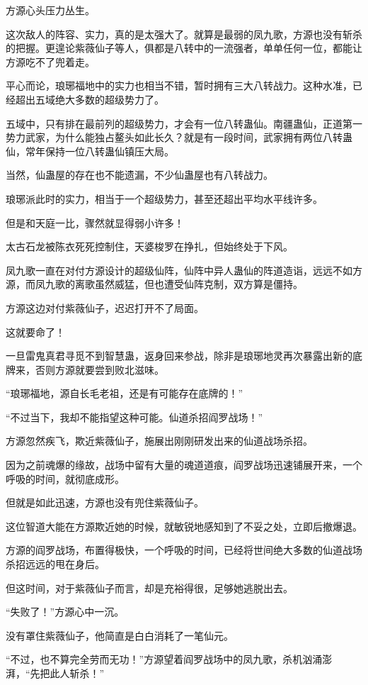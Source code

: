 \begin{this_body}
方源心头压力丛生。

这次敌人的阵容、实力，真的是太强大了。就算是最弱的凤九歌，方源也没有斩杀的把握。更遑论紫薇仙子等人，俱都是八转中的一流强者，单单任何一位，都能让方源吃不了兜着走。

平心而论，琅琊福地中的实力也相当不错，暂时拥有三大八转战力。这种水准，已经超出五域绝大多数的超级势力了。

五域中，只有排在最前列的超级势力，才会有一位八转蛊仙。南疆蛊仙，正道第一势力武家，为什么能独占鳌头如此长久？就是有一段时间，武家拥有两位八转蛊仙，常年保持一位八转蛊仙镇压大局。

当然，仙蛊屋的存在也不能遗漏，不少仙蛊屋也有八转战力。

琅琊派此时的实力，相当于一个超级势力，甚至还超出平均水平线许多。

但是和天庭一比，骤然就显得弱小许多！

太古石龙被陈衣死死控制住，天婆梭罗在挣扎，但始终处于下风。

凤九歌一直在对付方源设计的超级仙阵，仙阵中异人蛊仙的阵道造诣，远远不如方源，而凤九歌的离歌虽然威猛，但也遭受仙阵克制，双方算是僵持。

方源这边对付紫薇仙子，迟迟打开不了局面。

这就要命了！

一旦雷鬼真君寻觅不到智慧蛊，返身回来参战，除非是琅琊地灵再次暴露出新的底牌来，否则方源就要尝到败北滋味。

“琅琊福地，源自长毛老祖，还是有可能存在底牌的！”

“不过当下，我却不能指望这种可能。仙道杀招阎罗战场！”

方源忽然疾飞，欺近紫薇仙子，施展出刚刚研发出来的仙道战场杀招。

因为之前魂爆的缘故，战场中留有大量的魂道道痕，阎罗战场迅速铺展开来，一个呼吸的时间，就彻底成形。

但就是如此迅速，方源也没有兜住紫薇仙子。

这位智道大能在方源欺近她的时候，就敏锐地感知到了不妥之处，立即后撤爆退。

方源的阎罗战场，布置得极快，一个呼吸的时间，已经将世间绝大多数的仙道战场杀招远远的甩在身后。

但这时间，对于紫薇仙子而言，却是充裕得很，足够她逃脱出去。

“失败了！”方源心中一沉。

没有罩住紫薇仙子，他简直是白白消耗了一笔仙元。

“不过，也不算完全劳而无功！”方源望着阎罗战场中的凤九歌，杀机汹涌澎湃，“先把此人斩杀！”


\end{this_body}
